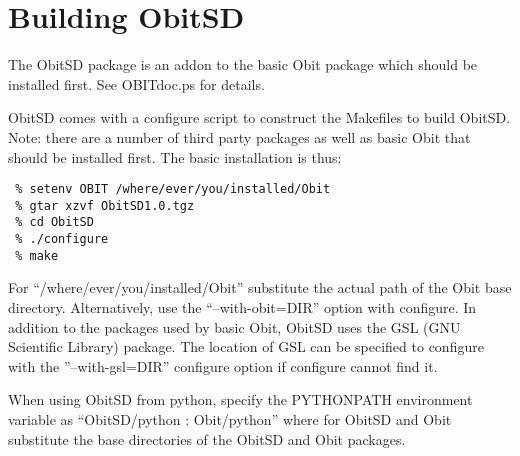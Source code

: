 \documentclass[11pt]{article}
\begin{document}
\section{Building ObitSD}
The ObitSD package is an addon to the basic Obit package which should
be installed first.
See OBITdoc.ps for details.

ObitSD comes with a configure script to construct the Makefiles to build
ObitSD.
Note: there are a number of third party packages as well as basic Obit
that should be installed first.
The basic installation is thus:
\begin{verbatim}
 % setenv OBIT /where/ever/you/installed/Obit 
 % gtar xzvf ObitSD1.0.tgz
 % cd ObitSD
 % ./configure
 % make
\end{verbatim}
For ``/where/ever/you/installed/Obit'' substitute the actual path of
the Obit base directory.
Alternatively, use the ``--with-obit=DIR'' option with configure.
In addition to the packages used by basic Obit, ObitSD uses the GSL
(GNU Scientific Library) package.
The location of GSL can be specified to configure with the ''--with-gsl=DIR''
configure option if configure cannot find it.

When using ObitSD from python, specify the PYTHONPATH environment
variable as ``ObitSD/python : Obit/python'' where for ObitSD and Obit
substitute the base directories of the ObitSD and Obit packages.
\end{document}
